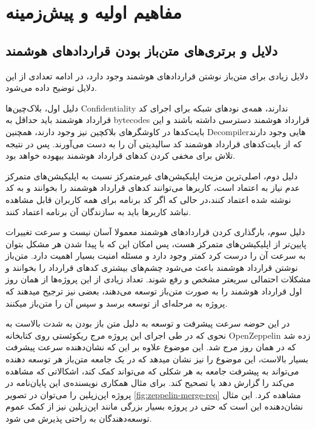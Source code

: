 \chapter{مفاهیم اولیه و پیش‌زمینه}
\section{دلایل و برتری‌های متن‌باز بودن قرارداد‌های هوشمند}
دلایل زیادی برای متن‌باز نوشتن قراردادهای هوشمند وجود دارد، در ادامه تعدادی از این دلایل توضیح داده می‌شود.

دلیل اول، بلاک‌چین‌ها
\gls{Confidentiality}
ندارند، همه‌ی نود‌های شبکه برای اجرای کد قرارداد هوشمند باید حداقل به
\glspl{bytecode}
قرارداد هوشمند دسترسی داشته باشند و این بایت‌کد‌ها در کاوشگرهای بلاکچین نیز وجود دارند، همچنین
\gls{Decompiler}هایی
وجود دارند که از بایت‌کد‌های قرارداد هوشمند کد سالیدیتی آن را به دست می‌آورند. پس در نتیجه تلاش برای مخفی کردن کدهای قرارداد هوشمند بیهوده خواهد بود.

دلیل دوم، اصلی‌ترین مزیت اپلیکیشن‌های غیرمتمرکز نسبت به اپلیکیشن‌های متمرکز عدم نیاز به اعتماد است، کاربرها می‌توانند کد‌های قرارداد هوشمند را بخوانند و به کد نوشته شده اعتماد کنند،‌در حالی که اگر کد برنامه برای همه کاربران قابل مشاهده نباشد کاربرها باید به سازندگان آن برنامه اعتماد کنند.

دلیل سوم، بارگذاری کردن قرارداد‌های هوشمند معمولا آسان نیست و سرعت تغییرات پایین‌تر از اپلیکیشن‌های متمرکز هست،‌ پس امکان این که با پیدا شدن هر مشکل بتوان به سرعت آن را درست کرد کمتر وجود دارد و مسئله امنیت بسیار اهمیت دارد. متن‌باز نوشتن قرارداد هوشمند باعث می‌شود چشم‌های بیشتری کدهای قرارداد را بخوانند و مشکلات احتمالی سریعتر مشخص و رفع شوند. تعداد زیادی از این پروژه‌ها از همان روز اول قرارداد هوشمند را به صورت متن‌باز توسعه می‌دهند، بعضی نیز ترجیح میدهند که پروژه به مرحله‌ای از توسعه برسد و سپس آن را متن‌باز میکنند.

در این حوضه سرعت پیشرفت و توسعه به دلیل متن باز بودن به شدت بالاست به نحوی که در طی اجرای این پروژه مرج ریکوئستی روی کتابخانه
\gls{OpenZeppelin}
زده شد که در همان روز مرج شد. این موضوع علاوه بر این که نشان‌دهنده سرعت پیشرفت بسیار بالاست، این موضوع را نیز نشان میدهد که در یک جامعه متن‌باز هر توسعه دهنده می‌تواند به پیشرفت جامعه به هر شکلی که می‌تواند کمک کند، اشکالاتی که مشاهده می‌کند را گزارش دهد یا تصحیح کند.
برای مثال همکاری
نویسنده‌ی این پایان‌نامه در پروژه اپن‌زپلین را می‌توان در تصویر
\ref{fig:zeppelin-merge-req}
مشاهده کرد. این مثال نشان‌دهنده این است که حتی در پروژه بسیار بزرگی مانند اپن‌زپلین نیز از کمک عموم توسعه‌دهندگان به راحتی پذیرش می شود.

